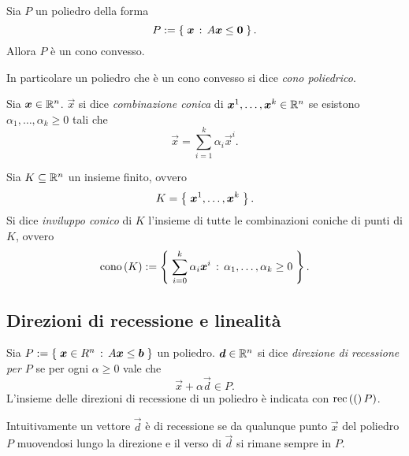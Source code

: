 \begin{proposition}
    Sia $P$ un poliedro della forma \begin{equation}
        P := \left\{\;\bm{x} \,:\, A\bm{x} \leq \bm{0}\;\right\}.
    \end{equation} Allora $P$ è un cono convesso.
\end{proposition}

In particolare un poliedro che è un cono convesso si dice \emph{cono poliedrico}.

\begin{definition}
     Sia $\bm{x} \in \mathbb{R}^n$. $\vec x$ si dice \emph{combinazione conica} di $\bm{x}^1, \dots, \bm{x}^k \in \mathbb{R}^n$ se esistono $\alpha_1, \dots, \alpha_k \geq 0$ tali che \begin{equation}
        \vec x = \sum_{i = 1}^k \alpha_i\vec x^i.
    \end{equation}
\end{definition}

\begin{definition}
     Sia $K \subseteq \mathbb{R}^n$ un insieme finito, ovvero \[
        K = \left\{\;\bm{x}^1, \dots, \bm{x}^k\;\right\}.    
    \] Si dice \emph{inviluppo conico} di $K$ l'insieme di tutte le combinazioni coniche di punti di $K$, ovvero \begin{equation}
        \cono{K} \deq \set{\sum_{i = 0}^k \alpha_i\vec x^i \suchthat \alpha_1, \dots, \alpha_k \geq 0}.
    \end{equation}
\end{definition}

\subsection{Direzioni di recessione e linealità}

\begin{definition}
    Sia $P := \left\{\;\bm{x} \in R^n \,:\, A\bm{x} \leq \bm{b}\;\right\}$ un poliedro. $\bm{d} \in \mathbb{R}^n$ si dice \emph{direzione di recessione per $P$} se per ogni $\alpha \geq 0$ vale che \[
        \vec x + \alpha\vec d \in P.    
    \] L'insieme delle direzioni di recessione di un poliedro è indicata con $\rec(P)$.
\end{definition}

Intuitivamente un vettore $\vec d$ è di recessione se da qualunque punto $\vec x$ del poliedro $P$ muovendosi lungo la direzione e il verso di $\vec d$ si rimane sempre in $P$.

